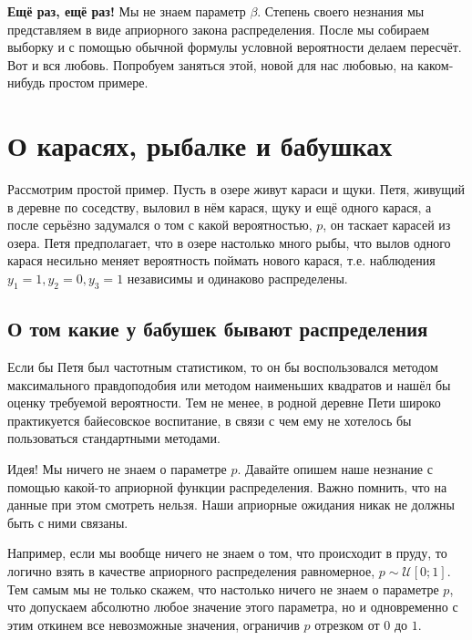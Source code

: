 \documentclass[12pt, a4paper, oneside]{extreport}
\def \mU{\mathcal{U}}
\theoremstyle{plain}              %
\theoremstyle{definition}         %
\begin{document}
\textbf{Ещё раз, ещё раз!} Мы не знаем параметр $\beta$. Степень своего незнания мы представляем в виде априорного закона распределения. После мы собираем выборку и с помощью обычной формулы условной вероятности делаем пересчёт. Вот и вся любовь. Попробуем заняться этой, новой для нас любовью, на каком-нибудь простом примере.

\section{О карасях, рыбалке и бабушках}

Рассмотрим простой пример. Пусть в озере живут караси и щуки. Петя, живущий в деревне по соседству, выловил в нём карася, щуку и ещё одного карася, а после серьёзно задумался о том с какой вероятностью, $p$, он таскает карасей из озера. Петя предполагает, что в озере настолько много рыбы, что вылов одного карася несильно меняет вероятность поймать нового карася, т.е. наблюдения $y_1 = 1, y_2 = 0, y_3 = 1$ независимы и одинаково распределены.

\subsection*{О том какие у бабушек бывают распределения}

Если бы Петя был частотным статистиком, то он бы воспользовался методом максимального правдоподобия или методом наименьших квадратов и нашёл бы оценку требуемой вероятности. Тем не менее, в родной деревне Пети широко практикуется байесовское воспитание, в связи с чем ему не хотелось бы пользоваться стандартными методами.

Идея! Мы ничего не знаем о параметре $p$. Давайте опишем наше незнание с помощью какой-то априорной функции распределения. Важно  помнить, что на данные при этом смотреть нельзя. Наши априорные ожидания никак не должны быть с ними связаны.

Например, если мы вообще ничего не знаем о том, что происходит в пруду, то логично взять в качестве априорного распределения равномерное, $p \sim \mU[0;1]$. Тем самым мы не только скажем, что настолько ничего не знаем о параметре $p$, что допускаем абсолютно любое значение этого параметра, но и одновременно с этим откинем все невозможные значения, ограничив $p$ отрезком от $0$ до $1$.
\end{document}
